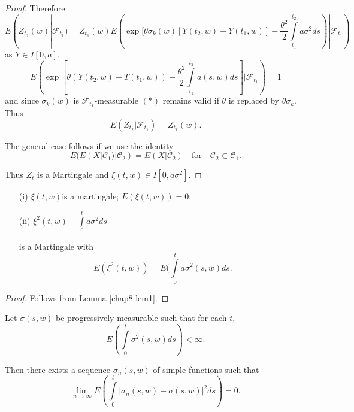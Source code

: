 \begin{proof}
Therefore
{\fontsize{10pt}{12pt}\selectfont
$$
E(Z_{t_{2}}(w)|\mathscr{F}_{t_{1}})=Z_{t_{1}}(w)E(\exp[\theta\sigma_{k}(w)[Y(t_{2},w)-Y(t_{1},w)]-\frac{\theta^{2}}{2}\int\limits^{t_{2}}_{t_{1}}a\sigma^{2}ds)|\mathscr{F}_{t_{1}}) 
$$}\relax
as $Y\in I[0,a]$.
\begin{equation*}
E(\exp[\theta(Y(t_{2},w)-T(t_{1},w))-\frac{\theta^{2}}{2}\int\limits^{t_{2}}_{t_{1}}a(s,w)ds]|\mathscr{F}_{t_{1}})=1\tag{*}
\end{equation*}
and since $\sigma_{k}(w)$ is $\mathscr{F}_{t_{1}}$-measurable $(*)$
remains valid if $\theta$ is replaced by $\theta\sigma_{k}$. Thus
$$
E(Z_{t_{2}}|\mathscr{F}_{t_{1}})=Z_{t_{1}}(w).
$$

The general case follows if we use the identity
$$
E(E(X|\mathscr{C}_{1})|\mathscr{C}_{2})=E(X|\mathscr{C}_{2})\quad\text{for}\quad
\mathscr{C}_{2}\subset \mathscr{C}_{1}.
$$

Thus $Z_{t}$ is a Martingale and $\xi(t,w)\in I[0,a\sigma^{2}]$.
\end{proof}

\begin{coro*}
\begin{itemize}
\item[(i)] $\xi(t,w)$\pageoriginale is a martingale; $E(\xi(t,w))=0$;

\item[(ii)] $\xi^{2}(t,w)-\int\limits^{t}_{0}a\sigma^{2}ds$

is a Martingale with
$$
E(\xi^{2}(t,w))=E(\int\limits^{t}_{0}a\sigma^{2}(s,w)ds.
$$
\end{itemize}
\end{coro*}

\begin{proof}
Follows from Lemma \ref{chap8-lem1}.
\end{proof}

\begin{lemma}\label{chap11-lem3}
Let $\sigma(s,w)$ be progressively measurable such that for each $t$,
$$
E(\int\limits^{t}_{0}\sigma^{2}(s,w)ds)<\infty.
$$

Then there exists a sequence $\sigma_{n}(s,w)$ of simple functions
such that
$$
\lim\limits_{n\to \infty}E\left(\int\limits^{t}_{0}|\sigma_{n}(s,w)-\sigma(s,w)|^{2}ds\right)=0.
$$
\end{lemma}


